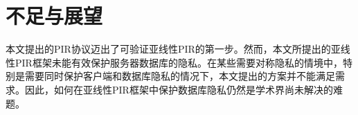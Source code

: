 \section{不足与展望}
本文提出的PIR协议迈出了可验证亚线性PIR的第一步。然而，本文所提出的亚线性PIR框架未能有效保护服务器数据库的隐私。在某些需要对称隐私的情境中，特别是需要同时保护客户端和数据库隐私的情况下，本文提出的方案并不能满足需求。因此，如何在亚线性PIR框架中保护数据库隐私仍然是学术界尚未解决的难题。
